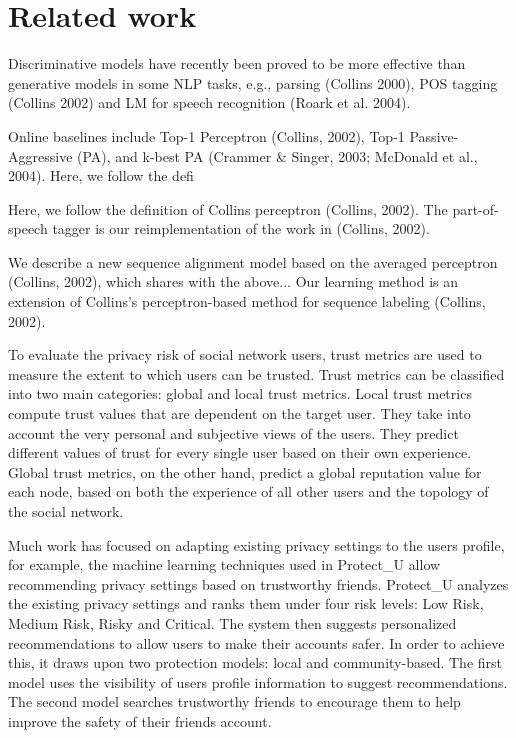 \section{Related work} \label{sec:Related work}

Discriminative models have recently been proved to be more effective than generative models in some NLP tasks,
	e.g.,
	parsing (Collins 2000),
	POS tagging (Collins 2002) and LM for speech recognition (Roark et al. 2004).

Online baselines include Top-1 Perceptron (Collins, 2002),
	Top-1 Passive-Aggressive (PA),
	and k-best PA (Crammer & Singer, 2003;
	McDonald et al., 2004).
Here,
	we follow the defi 

Here,
	we follow the definition of Collins perceptron (Collins, 2002).
The part-of-speech tagger is our reimplementation of the work in (Collins, 2002).

We describe a new sequence alignment model based on the averaged perceptron (Collins, 2002),
	which shares with the above...
Our learning method is an extension of Collins’s perceptron-based method for sequence labeling (Collins, 2002).


To evaluate the privacy risk of social network users,
	trust metrics are used to measure the extent to which users can be trusted.
Trust metrics can be classified into two main categories:
	global and local trust metrics.
Local trust metrics compute trust values that are dependent on the target user.
They take into account the very personal and subjective views of the users.
They predict different values of trust for every single user based on their own experience.
Global trust metrics,
	on the other hand,
	predict a global reputation value for each node,
	based on both the experience of all other users and the topology of the social network.

Much work has focused on adapting existing privacy settings to the users profile,
	for example,
	the machine learning techniques used in Protect\_U \cite{gandouz_protect_2012} allow recommending privacy settings based on trustworthy friends.
Protect\_U analyzes the existing privacy settings and ranks them under four risk levels:
	Low Risk,
	Medium Risk,
	Risky and Critical.
The system then suggests personalized recommendations to allow users to make their accounts safer.
In order to achieve this,
	it draws upon two protection models:
	local and community-based.
The first model uses the visibility of users profile information to suggest recommendations.
The second model searches trustworthy friends to encourage them to help improve the safety of their friends account.

